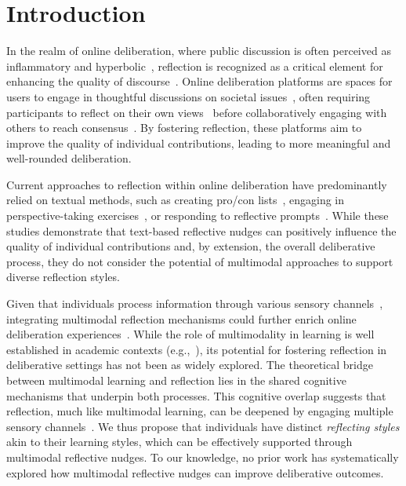 \section{Introduction}

In the realm of online deliberation, where public discussion is often perceived as inflammatory and hyperbolic~\cite{diakopoulos2011towards}, reflection is recognized as a critical element for enhancing the quality of discourse~\cite{muradova2021seeing, dryzek2002deliberative, goodin2000democratic, chambers2003deliberative, goodin2003does}. Online deliberation platforms are spaces for users to engage in thoughtful discussions on societal issues~\cite{jacobs2009talking}, often requiring participants to reflect on their own views~\cite{zhang2021nudge, goodin2003does, bohman2000public, goodin2000democratic} before collaboratively engaging with others to reach consensus~\cite{dekker2015contingency}. By fostering reflection, these platforms aim to improve the quality of individual contributions, leading to more meaningful and well-rounded deliberation.

Current approaches to reflection within online deliberation have predominantly relied on textual methods, such as creating pro/con lists~\cite{kriplean2012supporting}, engaging in perspective-taking exercises~\cite{kim2019crowdsourcing}, or responding to reflective prompts~\cite{zhang2021nudge}. While these studies demonstrate that text-based reflective nudges can positively influence the quality of individual contributions and, by extension, the overall deliberative process, they do not consider the potential of multimodal approaches to support diverse reflection styles. 

Given that individuals process information through various sensory channels~\cite{mayer2005cambridge}, integrating multimodal reflection mechanisms could further enrich online deliberation experiences~\cite{mayer2005cambridge}. While the role of multimodality in learning is well established in academic contexts (e.g.,~\cite{mayer2005cambridge}), its potential for fostering reflection in deliberative settings has not been as widely explored. The theoretical bridge between multimodal learning and reflection lies in the shared cognitive mechanisms that underpin both processes. This cognitive overlap suggests that reflection, much like multimodal learning, can be deepened by engaging multiple sensory channels~\cite{moon2013handbook}. We thus propose that individuals have distinct \textit{reflecting styles} akin to their learning styles, which can be effectively supported through multimodal reflective nudges. To our knowledge, no prior work has systematically explored how multimodal reflective nudges can improve deliberative outcomes.

